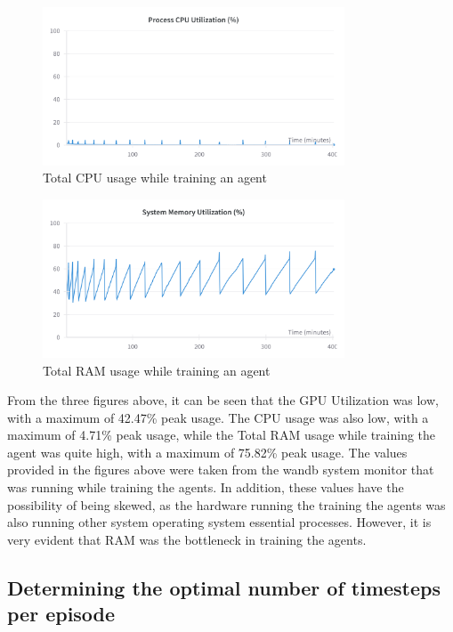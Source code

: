 \begin{figure}[H]
    \centering
    \includegraphics[width=0.8\textwidth]{figures/total_cpu_utilization.png}
    \caption{Total CPU usage while training an agent}
    \label{fig:ram_usage}
\end{figure}

\begin{figure}[H]
    \centering
    \includegraphics[width=0.8\textwidth]{figures/System_RAM_Utilization.png}
    \caption{Total RAM usage while training an agent}
    \label{fig:sys_memory_useage}
\end{figure}

From the three figures above, it can be seen that the GPU Utilization was low, with a maximum of 42.47\% peak usage. The CPU usage was also low, with a maximum of 4.71\% peak usage, while the Total RAM usage while training the agent was quite high, with a maximum of 75.82\% peak usage. The values provided in the figures above were taken from the wandb system monitor that was running while training the agents. In addition, these values have the possibility of being skewed, as the hardware running the training the agents was also running other system operating system essential processes. However, it is very evident that RAM was the bottleneck in training the agents.  

\subsection{Determining the optimal number of timesteps per episode}

